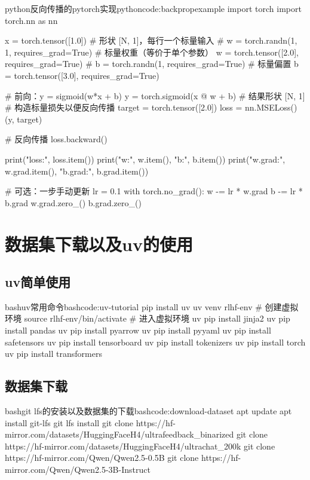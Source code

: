 \documentclass[lang=cn,newtx,10pt,scheme=chinese]{elegantbook}
\begin{document}
\begin{codebox}{python}{反向传播的pytorch实现}{pythoncode:backpropexample}
import torch
import torch.nn as nn

x = torch.tensor([1.0])            # 形状 [N, 1]，每行一个标量输入
# w = torch.randn(1, 1, requires_grad=True)  # 标量权重（等价于单个参数）
w = torch.tensor([2.0], requires_grad=True)
# b = torch.randn(1, requires_grad=True)     # 标量偏置
b = torch.tensor([3.0], requires_grad=True)

# 前向：y = sigmoid(w*x + b)
y = torch.sigmoid(x @ w + b)     # 结果形状 [N, 1]
# 构造标量损失以便反向传播
target = torch.tensor([2.0])
loss = nn.MSELoss()(y, target)

# 反向传播
loss.backward()

print("loss:", loss.item())
print("w:", w.item(), "b:", b.item())
print("w.grad:", w.grad.item(), "b.grad:", b.grad.item())

# 可选：一步手动更新
lr = 0.1
with torch.no_grad():
    w -= lr * w.grad
    b -= lr * b.grad
    w.grad.zero_()
    b.grad.zero_()
\end{codebox}

\chapter{数据集下载以及uv的使用}

\section{uv简单使用}

\begin{codebox}{bash}{uv常用命令}{bashcode:uv-tutorial}
pip install uv
uv venv rlhf-env # 创建虚拟环境
source rlhf-env/bin/activate # 进入虚拟环境
uv pip install jinja2
uv pip install pandas
uv pip install pyarrow
uv pip install pyyaml
uv pip install safetensors
uv pip install tensorboard
uv pip install tokenizers
uv pip install torch
uv pip install transformers
\end{codebox}


\section{数据集下载}

\begin{codebox}{bash}{git lfs的安装以及数据集的下载}{bashcode:download-dataset}
apt update
apt install git-lfs
git lfs install
git clone https://hf-mirror.com/datasets/HuggingFaceH4/ultrafeedback_binarized
git clone https://hf-mirror.com/datasets/HuggingFaceH4/ultrachat_200k
git clone https://hf-mirror.com/Qwen/Qwen2.5-0.5B
git clone https://hf-mirror.com/Qwen/Qwen2.5-3B-Instruct
\end{codebox}
\end{document}
